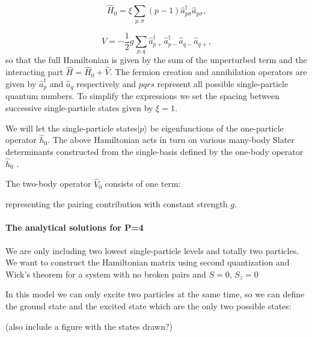 \documentclass[twoside]{article}
\begin{document}
\begin{equation}
\hat H_0 = \xi \sum_{p,\sigma} (p-1) \hat a_{p\sigma}^\dagger \hat a_{p\sigma},
\label{eq:H_0}
\end{equation}

\begin{equation}
\hat V = -\frac{1}{2} g \sum_{p,q} \hat a_{p+}^\dagger \hat a_{p-}^\dagger \hat a_{q-} \hat a_{q+} ,\label{eq:V}
\end{equation}
so that the full Hamiltonian is given by the sum of the unperturbed term and the interacting part $\hat H = \hat H_0 + \hat V$. The fermion creation and annihilation operators are given by $\hat a_{p}^\dagger$ and $\hat a_{q}$ respectively and $pqrs$ represent all possible single-particle quantum numbers. To simplify the expressions we set the spacing between successive single-particle states given by $\xi=1$.

We will let the single-particle states$\vert p \rangle$ be eigenfunctions of the one-particle operator $\hat{h}_0$. The above Hamiltonian acts in turn on various many-body Slater determinants constructed from the single-basis defined by the one-body operator $\hat{h}_0$ .


The two-body operator $\hat{V}_0$ consists of one term:
\begin{equation}
\end{equation}

representing the pairing contribution with constant strength $g$.


\newpage

\paragraph{The analytical solutions for P=4}
We are only including two lowest single-particle levels and totally two particles.  We want to construct the Hamiltonian matrix using second quantization and Wick’s theorem for a system with no broken pairs and $S=0$, $S_z=0$

In this model we can only excite two particles at the same time, so we can define the ground state and the excited state which are the only two possible states:

(also include a figure with the states drawn?)


\end{document}
